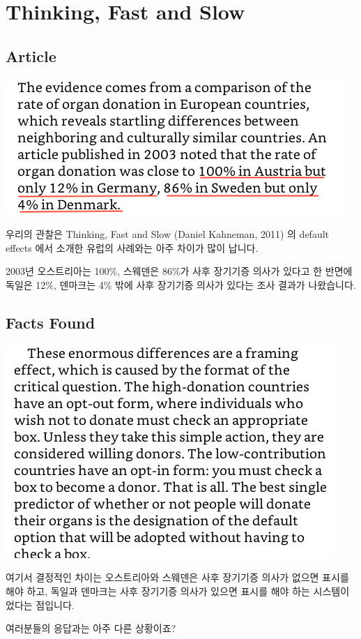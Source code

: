 \documentclass[
]{book}
\begin{document}
\section{Thinking, Fast and Slow}\label{thinking-fast-and-slow}

\subsection{Article}\label{article}

\begin{flushleft}\includegraphics[width=0.5\linewidth]{./pics/organ_donation_01} \end{flushleft}

우리의 관찰은 Thinking, Fast and Slow (Daniel Kahneman, 2011) 의 default effects 에서 소개한 유럽의 사례와는 아주 차이가 많이 납니다.

2003년 오스트리아는 100\%, 스웨덴은 86\%가 사후 장기기증 의사가 있다고 한 반면에 독일은 12\%, 덴마크는 4\% 밖에 사후 장기기증 의사가 있다는 조사 결과가 나왔습니다.

\subsection{Facts Found}\label{facts-found}

\begin{flushleft}\includegraphics[width=0.5\linewidth]{./pics/organ_donation_02} \end{flushleft}

여기서 결정적인 차이는 오스트리아와 스웨덴은 사후 장기기증 의사가 없으면 표시를 해야 하고, 독일과 덴마크는 사후 장기기증 의사가 있으면 표시를 해야 하는 시스템이었다는 점입니다.

여러분들의 응답과는 아주 다른 상황이죠?
\end{document}
